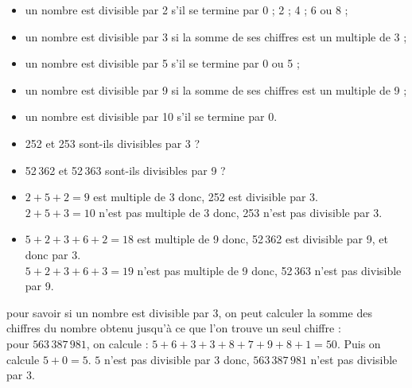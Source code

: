 \begin{propriete}
   \begin{itemize}
      \item un nombre est divisible par 2 s'il se termine par 0 ; 2 ; 4 ; 6 ou 8 ;
      \item un nombre est divisible par 3 si la somme de ses chiffres est un multiple de 3 ;
      \item un nombre est divisible par 5 s'il se termine par 0 ou 5 ;
      \item un nombre est divisible par 9 si la somme de ses chiffres est un multiple de 9 ;
      \item un nombre est divisible par 10 s'il se termine par 0.
   \end{itemize}
   \vspace*{-3mm}
\end{propriete}

\begin{exemple*1}
   \begin{itemize}
      \item 252 et 253 sont-ils divisibles par 3 ?
      \item 52\,362 et 52\,363 sont-ils divisibles par 9 ?
    \end{itemize}   
   \correction
      \begin{itemize}
         \item $2+5+2=9$ est multiple de 3 donc, 252 est divisible par 3. \\
            $2+5+3=10$ n'est pas multiple de 3 donc, 253 n'est pas divisible par 3.
         \item $5+2+3+6+2=18$ est multiple de 9 donc, 52\,362 est divisible par 9, et donc par 3. \\
            $5+2+3+6+3=19$ n'est pas multiple de 9 donc, 52\,363 n'est pas divisible par 9.
       \end{itemize}
    \vspace*{-3mm}
\end{exemple*1}

\begin{remarque}
   pour savoir si un nombre est divisible par $3$, on peut calculer la somme des chiffres du nombre obtenu jusqu'à ce que l'on trouve un seul chiffre : \\
   pour $563\,387\,981$, on calcule : $5+6+3+3+8+7+9+8+1=50$. Puis on calcule $5+0=5$.
   $5$ n'est pas divisible par $3$ donc, $563\,387\,981$ n'est pas divisible par $3$.
\end{remarque}




